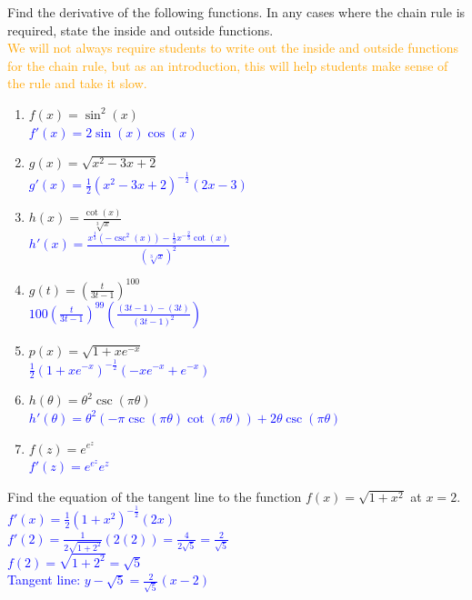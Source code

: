 \documentclass{ximera}
\begin{document}
\begin{exercise}
Find the derivative of the following functions.  In any cases where the chain rule is required, state the inside and outside functions.\\
\textcolor{orange}{We will not always require students to write out the inside and outside functions for the chain rule, but as an introduction, this will help students make sense of the rule and take it slow.}
    \begin{enumerate}
        \item $\displaystyle f(x)=\sin^2(x)$ \\
        \textcolor{blue}{ $f'(x)=2\sin(x)\cos(x)$}

        \item $g(x)=\sqrt{x^2-3x+2}$ \\
        \textcolor{blue}{ $g'(x)=\frac12(x^2-3x+2)^{-\frac12}(2x-3)$}

        \item $\displaystyle h(x)=\frac{\cot(x)}{\sqrt[3]{x}}$\\
        \textcolor{blue}{ $h'(x)=\frac{x^{\frac13}(-\csc^2(x))-\frac13x^{-\frac23}\cot(x)}{(\sqrt[3]{x})^2}$}

        \item $g(t)=(\frac{t}{3t-1})^{100}$\\
        \textcolor{blue}{$100(\frac{t}{3t-1})^{99}(\frac{(3t-1)-(3t)}{(3t-1)^2})$}
        
        \item $p(x)=\sqrt{1+xe^{-x}}$\\
        \textcolor{blue}{$\frac{1}{2}(1+xe^{-x})^{-\frac12}(-xe^{-x}+e^{-x})$}
        
        \item $\displaystyle h(\theta)=\theta^2\csc(\pi\theta)$\\
        \textcolor{blue}{ $h'(\theta)=\theta^2(-\pi\csc(\pi\theta)\cot(\pi\theta))+2\theta\csc(\pi\theta)$}

        \item $f(z)=e^{e^z}$\\
        \textcolor{blue}{ $f'(z)=e^{e^z}e^z$}
        
    \end{enumerate}

\end{exercise}

\begin{exercise}
    Find the equation of the tangent line to the function $f(x)=\sqrt{1+x^2}$ at $x=2$.\\
    \textcolor{blue}{$f'(x)=\frac12(1+x^2)^{-\frac12}(2x)$\\
    $f'(2)=\frac{1}{2\sqrt{1+2^2}}(2(2))=\frac{4}{2\sqrt{5}}=\frac{2}{\sqrt{5}}$\\
    $f(2)=\sqrt{1+2^2}=\sqrt{5}$\\
    Tangent line: $y-\sqrt{5}=\frac{2}{\sqrt{5}}(x-2)$}
\end{exercise}
\end{document}
